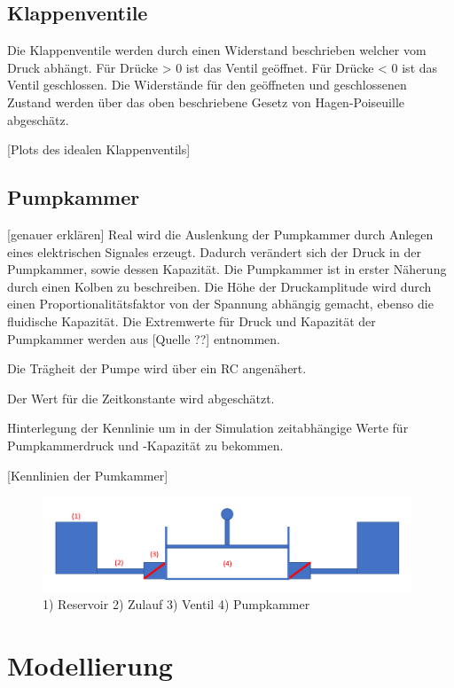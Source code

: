 \documentclass[fontsize=12pt, a4paper]{scrartcl}
\begin{document}
\subsection{Klappenventile}

Die Klappenventile werden durch einen Widerstand beschrieben welcher vom Druck abhängt. Für Drücke > 0 ist das Ventil geöffnet. Für Drücke < 0 ist das Ventil geschlossen. Die Widerstände für den geöffneten und geschlossenen Zustand werden über das oben beschriebene Gesetz von Hagen-Poiseuille abgeschätz.

[Plots des idealen Klappenventils]

\subsection{Pumpkammer} [genauer erklären]
Real wird die Auslenkung der Pumpkammer durch Anlegen eines elektrischen Signales erzeugt. Dadurch verändert sich der Druck in der Pumpkammer, sowie dessen Kapazität. Die Pumpkammer ist in erster Näherung durch einen Kolben zu beschreiben. Die Höhe der Druckamplitude wird durch einen Proportionalitätsfaktor von der Spannung abhängig gemacht, ebenso die fluidische Kapazität. Die Extremwerte für Druck und Kapazität der Pumpkammer werden aus [Quelle ??] entnommen.

Die Trägheit der Pumpe wird über ein RC angenähert.

Der Wert für die Zeitkonstante wird abgeschätzt.

Hinterlegung der Kennlinie um in der Simulation zeitabhängige Werte für Pumpkammerdruck und -Kapazität zu bekommen.

[Kennlinien der Pumkammer]

\begin{figure}[H]
	\centering
	\includegraphics[width=0.98\textwidth]{bilder/theorie/pumpe_prinzipskizze.PNG}
	\caption{1) Reservoir 2) Zulauf 3) Ventil 4) Pumpkammer}
\end{figure}


\section{Modellierung}
\end{document}
